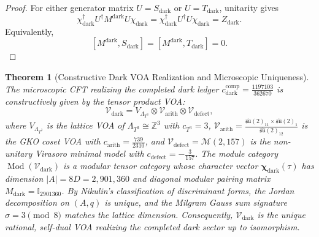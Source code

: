 \documentclass[11pt]{article}
\theoremstyle{plain}
\newtheorem{theorem}{Theorem}
\begin{document}
\begin{proof}
For either generator matrix \(U=S_{\text{dark}}\) or
\(U=T_{\text{dark}}\), unitarity gives
\begin{equation}
\label{eq:dark-unitary-pairing-proof}
 \chi_{\text{dark}}^\dagger U^\dagger M^{\text{dark}}U
 \chi_{\text{dark}}
 =\chi_{\text{dark}}^\dagger U^\dagger U\chi_{\text{dark}}
 =Z_{\text{dark}}.
\end{equation}
Equivalently,
\begin{equation}
\label{eq:dark-commutator-criterion}
 [M^{\text{dark}},S_{\text{dark}}]
 =[M^{\text{dark}},T_{\text{dark}}]=0.
\end{equation}
\end{proof}

\begin{theorem}[Constructive Dark VOA Realization and Microscopic Uniqueness]
\label{thm:supp-dark-voa-uniqueness}
The microscopic CFT realizing the completed dark ledger $c_{\mathrm{dark}}^{\mathrm{comp}} = \frac{1197103}{362670}$ is constructively given by the tensor product VOA:
\begin{equation}
\mathcal{V}_{\mathrm{dark}} = V_{\Lambda_{T^3}} \otimes \mathcal{V}_{\mathrm{arith}} \otimes \mathcal{V}_{\mathrm{defect}},
\end{equation}
where $V_{\Lambda_{T^3}}$ is the lattice VOA of $\Lambda_{T^3} \cong \mathbb{Z}^3$ with $c_{T^3} = 3$, $\mathcal{V}_{\mathrm{arith}} = \frac{\widehat{\mathfrak{su}}(2)_{11} \times \widehat{\mathfrak{su}}(2)_1}{\widehat{\mathfrak{su}}(2)_{12}}$ is the GKO coset VOA with $c_{\mathrm{arith}} = \frac{739}{2310}$, and $\mathcal{V}_{\mathrm{defect}} = \mathcal{M}(2, 157)$ is the non-unitary Virasoro minimal model with $c_{\mathrm{defect}} = -\frac{3}{157}$.
The module category $\operatorname{Mod}(\mathcal{V}_{\mathrm{dark}})$ is a modular tensor category whose character vector $\boldsymbol{\chi}_{\mathrm{dark}}(\tau)$ has dimension $|A| = 8D = 2{,}901{,}360$ and diagonal modular pairing matrix $M_{\mathrm{dark}} = \mathbb{I}_{2901360}$.
By Nikulin's classification of discriminant forms, the Jordan decomposition on $(A, q)$ is unique, and the Milgram Gauss sum signature $\sigma = 3 \pmod 8$ matches the lattice dimension. Consequently, $\mathcal{V}_{\mathrm{dark}}$ is the unique rational, self-dual VOA realizing the completed dark sector up to isomorphism.
\end{theorem}
\end{document}
